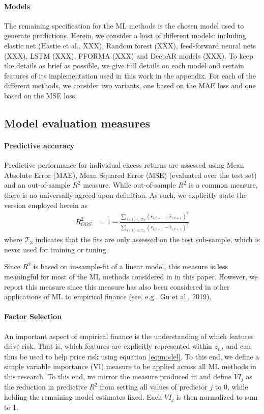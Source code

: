 \documentclass{article}
\begin{document}
\paragraph{Models} The remaining specification for the ML methods is the chosen model used to generate predictions. Herein, we consider a host of different models: including elastic net (Hastie et al., XXX), Random forest (XXX), feed-forward neural nets (XXX), LSTM (XXX), FFORMA (XXX) and DeepAR models (XXX). To keep the details as brief as possible, we give full details on each model and certain features of its implementation used in this work in the appendix. For each of the different methods, we consider two variants, one based on the MAE loss and one based on the MSE loss. 

\subsection{Model evaluation measures}
\paragraph{Predictive accuracy}

Predictive performance for individual excess returns are assessed using Mean Absolute Error (MAE), Mean Squared Error (MSE) (evaluated over the test set) and an out-of-sample $R^2$ measure. While  out-of-sample $R^2$ is a common measure, there is no universally agreed-upon definition. As such, we explicitly state the version employed herein as
\begin{align}
R^2_{OOS} &= 1 - \frac{\sum_{(i, t)\in\mathcal{T}_3}(r_{i, t+1} - \widehat{r}_{i, t+1})^2}
{\sum_{(i, t)\in\mathcal{T}_3} \left( r_{i, t+1} - \bar{r}_{i, t+1} \right) ^2}
\end{align}
where $\mathcal{T}_3$ indicates that the fits are only assessed on the test sub-sample, which is never used for training or tuning.

Since $R^2$ is based on in-sample-fit of a linear model, this measure is less meaningful for most of the ML methods considered in in this paper. However, we report this measure since this measure has also been considered in other applications of ML to empirical finance (see, e.g., Gu et al., 2019). 
\paragraph{Factor Selection}
An important aspect of empirical finance is the understanding of which features drive risk. That is, which features are explicitly represented within $z_{i,t}$ and can thus be used to help price risk using equation \ref{eq:model}. To this end, we define a simple variable importance (VI) measure to be applied across all ML methods in this research. To this end, we mirror the measure produced in \cite{gu_empirical_2018} and define $VI_j$ as the reduction in predictive $R^2$ from setting all values of predictor $j$ to 0, while holding the remaining model estimates fixed. Each $VI_j$ is then normalized to sum to 1. 
\end{document}
